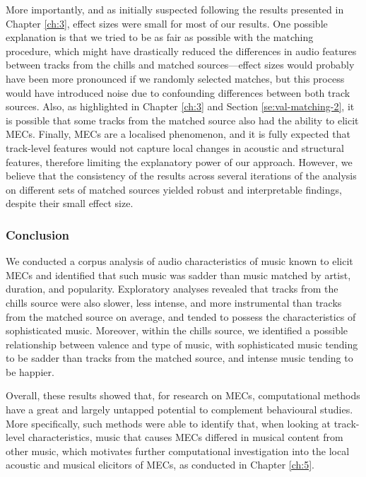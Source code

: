 More importantly, and as initially suspected following the results presented in Chapter \ref{ch:3}, effect sizes were small for most of our results. One possible explanation is that we tried to be as fair as possible with the matching procedure, which might have drastically reduced the differences in audio features between tracks from the chills and matched sources---effect sizes would probably have been more pronounced if we randomly selected matches, but this process would have introduced noise due to confounding differences between both track sources. Also, as highlighted in Chapter \ref{ch:3} and Section \ref{se:val-matching-2}, it is possible that some tracks from the matched source also had the ability to elicit MECs. Finally, MECs are a localised phenomenon, and it is fully expected that track-level features would not capture local changes in acoustic and structural features, therefore limiting the explanatory power of our approach. However, we believe that the consistency of the results across several iterations of the analysis on different sets of matched sources yielded robust and interpretable findings, despite their small effect size.

\subsubsection{Conclusion}

We conducted a corpus analysis of audio characteristics of music known to elicit MECs and identified that such music was sadder than music matched by artist, duration, and popularity. Exploratory analyses revealed that tracks from the chills source were also slower, less intense, and more instrumental than tracks from the matched source on average, and tended to possess the characteristics of sophisticated music. Moreover, within the chills source, we identified a possible relationship between valence and type of music, with sophisticated music tending to be sadder than tracks from the matched source, and intense music tending to be happier. 

Overall, these results showed that, for research on MECs, computational methods have a great and largely untapped potential to complement behavioural studies. More specifically, such methods were able to identify that, when looking at track-level characteristics, music that causes MECs differed in musical content from other music, which motivates further computational investigation into the local acoustic and musical elicitors of MECs, as conducted in Chapter \ref{ch:5}.
